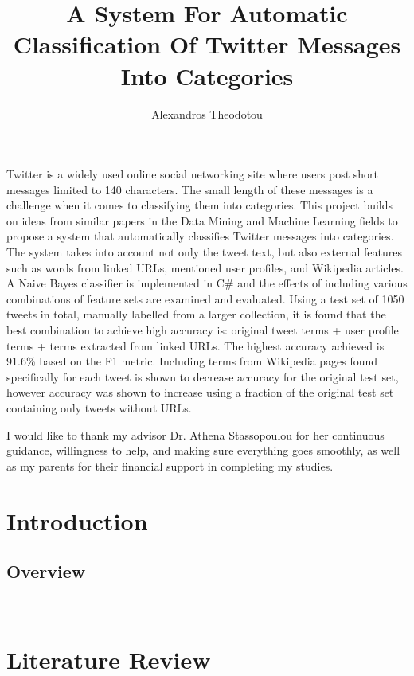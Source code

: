 \documentclass[phd,black]{PrincetonThesis}
\title{A System For Automatic Classification Of Twitter Messages Into Categories}
\author{Alexandros Theodotou}
\begin{document}
	
	\begin{frontmatter}
	 
	  \begin{thesisabstract}
Twitter is a widely used online social networking site where users post short messages limited to 140 characters. The small length of these messages is a challenge when it comes to classifying them into categories. This project builds on ideas from similar papers in the Data Mining and Machine Learning fields to propose a system that automatically classifies Twitter messages into categories. The system takes into account not only the tweet text, but also external features such as words from linked URLs, mentioned user profiles, and Wikipedia articles. A Naive Bayes classifier is implemented in C\# and the effects of including various combinations of feature sets are examined and evaluated. Using a test set of 1050 tweets in total, manually labelled from a larger collection, it is found that the best combination to achieve high accuracy is: original tweet terms + user profile terms + terms extracted from linked URLs. The highest accuracy achieved is 91.6\% based on the F1 metric. Including terms from Wikipedia pages found specifically for each tweet is shown to decrease accuracy for the original test set, however accuracy was shown to increase using a fraction of the original test set containing only tweets without URLs.
	  \end{thesisabstract}

	  \begin{acknowledgements}
I would like to thank my advisor Dr. Athena Stassopoulou for her continuous guidance, willingness to help, and making sure everything goes smoothly, as well as my parents for their financial support in completing my studies.
	  \end{acknowledgements}
	
	\end{frontmatter}
	
	\cleardoublepage
\chapter{Introduction}
\label{chap:intro}
\section{Overview}

\

\newpage

\chapter{Literature Review}
\label{chap:literature-review}
\end{document}
